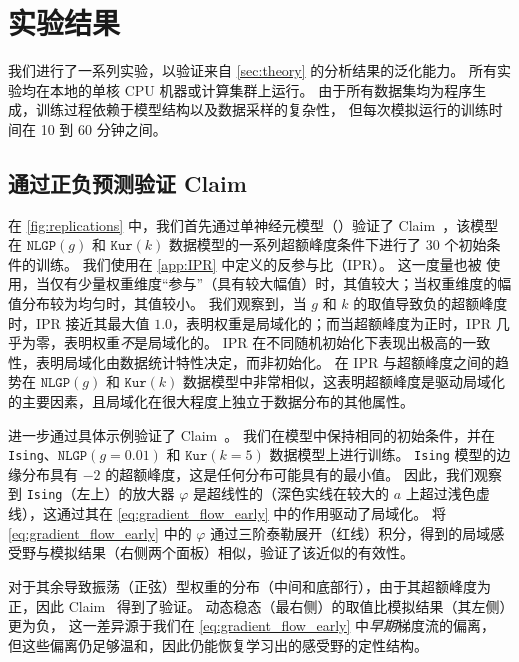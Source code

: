 \section{实验结果}
\label{sec:experiments}

我们进行了一系列实验，以验证来自 \cref{sec:theory} 的分析结果的泛化能力。  
所有实验均在本地的单核 CPU 机器或计算集群上运行。  
由于所有数据集均为程序生成，训练过程依赖于模型结构以及数据采样的复杂性，  
但每次模拟运行的训练时间在 10 到 60 分钟之间。
\subsection{通过正负预测验证 Claim~}
\label{sec:theory-validation}


在 \cref{fig:replications} 中，我们首先通过单神经元模型（）验证了 Claim~，该模型在 $\texttt{NLGP}(g)$ 和 $\texttt{Kur}(k)$ 数据模型的一系列超额峰度条件下进行了 30 个初始条件的训练。
我们使用在 \cref{app:IPR} 中定义的反参与比（IPR）。
这一度量也被 \textcite{ingrosso2022data} 使用，当仅有少量权重维度“参与”（具有较大幅值）时，其值较大；当权重维度的幅值分布较为均匀时，其值较小。
我们观察到，当 $g$ 和 $k$ 的取值导致负的超额峰度时，IPR 接近其最大值 $1.0$，表明权重是局域化的；而当超额峰度为正时，IPR 几乎为零，表明权重\emph{不}是局域化的。
IPR 在不同随机初始化下表现出极高的一致性，表明局域化由数据统计特性决定，而非初始化。
在 IPR 与超额峰度之间的趋势在 $\texttt{NLGP}(g)$ 和 $\texttt{Kur}(k)$ 数据模型中非常相似，这表明超额峰度是驱动局域化的主要因素，且局域化在很大程度上独立于数据分布的其他属性。


 进一步通过具体示例验证了 Claim~。
我们在模型中保持相同的初始条件，并在 \texttt{Ising}、$\texttt{NLGP}(g=0.01)$ 和 $\texttt{Kur}(k=5)$ 数据模型上进行训练。
\texttt{Ising} 模型的边缘分布具有 $-2$ 的超额峰度，这是任何分布可能具有的最小值。
因此，我们观察到 \texttt{Ising}（左上）的放大器 $\varphi$ 是超线性的（深色实线在较大的 $a$ 上超过浅色虚线），这通过其在 \cref{eq:gradient_flow_early} 中的作用驱动了局域化。
将 \cref{eq:gradient_flow_early} 中的 $\varphi$ 通过三阶泰勒展开（红线）积分，得到的局域感受野与模拟结果（右侧两个面板）相似，验证了该近似的有效性。

对于其余导致振荡（正弦）型权重的分布（中间和底部行），由于其超额峰度为正，因此 Claim~ 得到了验证。
动态稳态（最右侧）的取值比模拟结果（其左侧）更为负，
这一差异源于我们在 \cref{eq:gradient_flow_early} 中\emph{早期}梯度流的偏离，
但这些偏离仍足够温和，因此仍能恢复学习出的感受野的定性结构。

